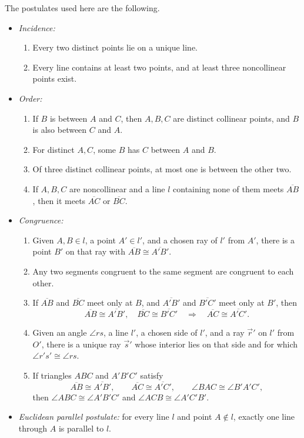The postulates used here are the following.
\begin{itemize}
\item \emph{Incidence:}
\begin{enumerate}
\item[(a)] Every two distinct points lie on a unique line.
\item[(b)] Every line contains at least two points, and at least three
noncollinear points exist.
\end{enumerate}
\item \emph{Order:}
\begin{enumerate}
\item[(a)] If $B$ is between $A$ and $C$, then $A,B,C$ are distinct collinear
points, and $B$ is also between $C$ and $A$.
\item[(b)] For distinct $A,C$, some $B$ has $C$ between $A$ and $B$.
\item[(c)] Of three distinct collinear points, at most one is between the
other two.
\item[(d)] If $A,B,C$ are noncollinear and a line $l$ containing none of them
meets $\overline{AB}$, then it meets $\overline{AC}$ or $\overline{BC}$.
\end{enumerate}
\item \emph{Congruence:}
\begin{enumerate}
\item[(a)] Given $A,B\in l$, a point $A'\in l'$, and a chosen ray of $l'$
from $A'$, there is a point $B'$ on that ray with
$\overline{AB}\cong\overline{A'B'}$.
\item[(b)] Any two segments congruent to the same segment are congruent to
each other.
\item[(c)] If $\overline{AB}$ and $\overline{BC}$ meet only at $B$, and
$\overline{A'B'}$ and $\overline{B'C'}$ meet only at $B'$, then
\[
\overline{AB}\cong\overline{A'B'},\quad
\overline{BC}\cong\overline{B'C'}
\quad\Longrightarrow\quad
\overline{AC}\cong\overline{A'C'}.
\]
\item[(d)] Given an angle $\angle rs$, a line $l'$, a chosen side of $l'$,
and a ray $\vec r'$ on $l'$ from $O'$, there is a unique ray $\vec s'$ whose
interior lies on that side and for which $\angle r's'\cong\angle rs$.
\item[(e)] If triangles $ABC$ and $A'B'C'$ satisfy
\[
\overline{AB}\cong\overline{A'B'},\qquad
\overline{AC}\cong\overline{A'C'},\qquad
\angle BAC\cong\angle B'A'C',
\]
then $\angle ABC\cong\angle A'B'C'$ and
$\angle ACB\cong\angle A'C'B'$.
\end{enumerate}
\item \emph{Euclidean parallel postulate:} for every line $l$ and point
$A\notin l$, exactly one line through $A$ is parallel to $l$.
\end{itemize}

